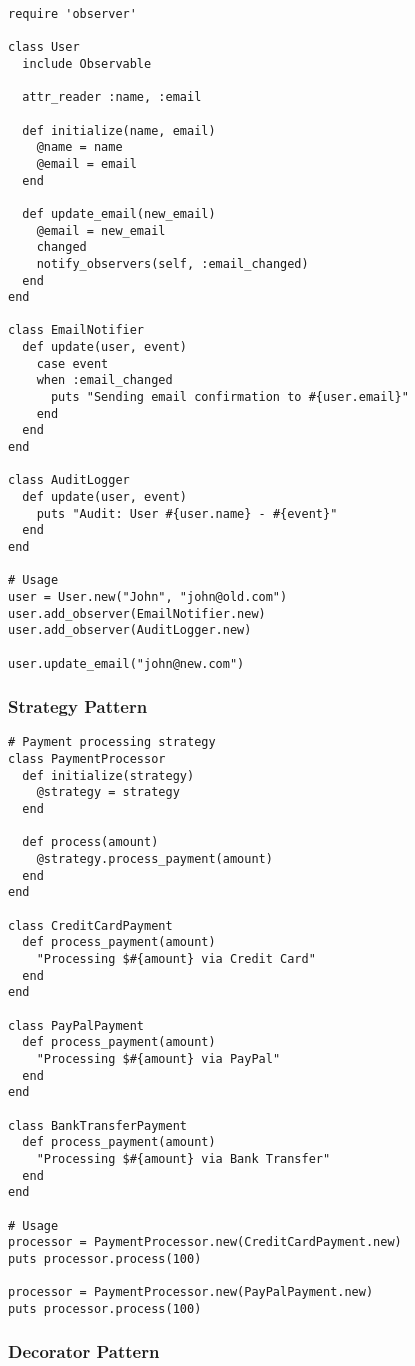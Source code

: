 \documentclass[12pt,a4paper]{article}
\begin{document}
\begin{lstlisting}
require 'observer'

class User
  include Observable
  
  attr_reader :name, :email
  
  def initialize(name, email)
    @name = name
    @email = email
  end
  
  def update_email(new_email)
    @email = new_email
    changed
    notify_observers(self, :email_changed)
  end
end

class EmailNotifier
  def update(user, event)
    case event
    when :email_changed
      puts "Sending email confirmation to #{user.email}"
    end
  end
end

class AuditLogger
  def update(user, event)
    puts "Audit: User #{user.name} - #{event}"
  end
end

# Usage
user = User.new("John", "john@old.com")
user.add_observer(EmailNotifier.new)
user.add_observer(AuditLogger.new)

user.update_email("john@new.com")
\end{lstlisting}

\subsubsection{Strategy Pattern}

\begin{lstlisting}
# Payment processing strategy
class PaymentProcessor
  def initialize(strategy)
    @strategy = strategy
  end
  
  def process(amount)
    @strategy.process_payment(amount)
  end
end

class CreditCardPayment
  def process_payment(amount)
    "Processing $#{amount} via Credit Card"
  end
end

class PayPalPayment
  def process_payment(amount)
    "Processing $#{amount} via PayPal"
  end
end

class BankTransferPayment
  def process_payment(amount)
    "Processing $#{amount} via Bank Transfer"
  end
end

# Usage
processor = PaymentProcessor.new(CreditCardPayment.new)
puts processor.process(100)

processor = PaymentProcessor.new(PayPalPayment.new)
puts processor.process(100)
\end{lstlisting}

\subsubsection{Decorator Pattern}
\end{document}

